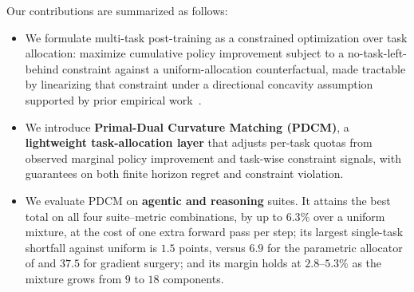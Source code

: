 Our contributions are summarized as follows:
\begin{itemize}
\item We formulate multi-task post-training as a constrained optimization over task
allocation: maximize cumulative policy improvement subject to a no-task-left-behind constraint
against a uniform-allocation counterfactual, made tractable by linearizing that constraint
under a directional concavity assumption supported by prior empirical
work~\citep{ye2025datamixinglawsoptimizing,chen2025aioli,kang2025autoscalescaleawaredatamixing}.

\item We introduce \textbf{Primal-Dual Curvature Matching (PDCM)}, a \textbf{lightweight
task-allocation layer} that adjusts per-task quotas from observed marginal policy
improvement and task-wise constraint signals, with guarantees on both finite horizon regret and
constraint violation.

\item We evaluate PDCM on \textbf{agentic and reasoning} suites. It attains the best total
on all four suite--metric combinations, by up to $6.3\%$ over a uniform mixture, at the cost of
one extra forward pass per step; its largest single-task shortfall against uniform is $1.5$
points, versus $6.9$ for the parametric allocator of \citet{chen2025aioli} and $37.5$ for
gradient surgery; and its margin holds at $2.8$--$5.3\%$ as the mixture grows from $9$ to $18$
components.

\end{itemize}
